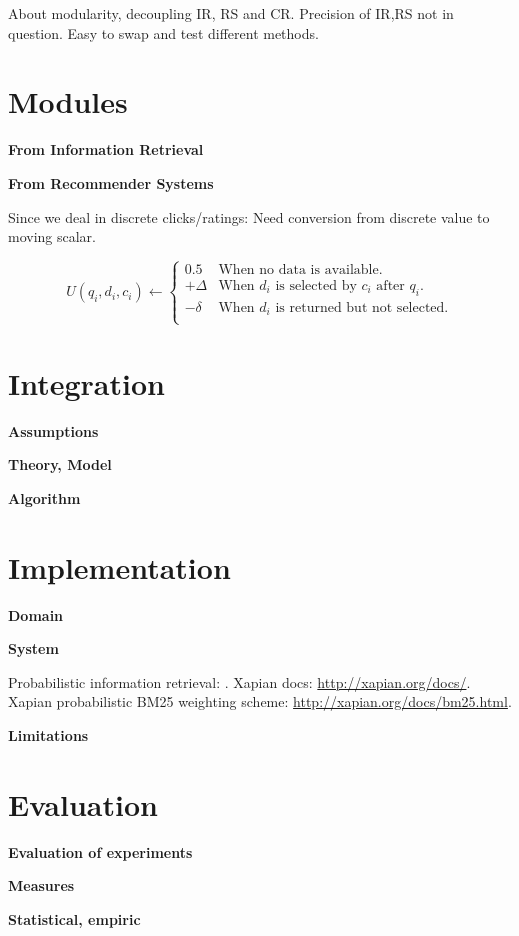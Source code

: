 About modularity, decoupling IR, RS and CR.
Precision of IR,RS not in question.
Easy to swap and test different methods.


\section{Modules}

\textbf{From Information Retrieval}

\textbf{From Recommender Systems}

Since we deal in discrete clicks/ratings: 
Need conversion from discrete value to moving scalar.

\begin{equation}
  U(q_i, d_i, c_i) \leftarrow 
  \begin{cases}
    0.5       &  \text{When no data is available.}\\
    +\Delta   &  \text{When $d_i$ is selected by $c_i$ after $q_i$.}\\
    -\delta   &  \text{When $d_i$ is returned but not selected.}\\
  \end{cases}
\end{equation}


\section{Integration}

\textbf{Assumptions}

\textbf{Theory, Model}

\textbf{Algorithm}


\section{Implementation}

\textbf{Domain}

\textbf{System}

Probabilistic information retrieval: \cite[p204]{Manning2008}.
Xapian docs: \url{http://xapian.org/docs/}.
Xapian probabilistic BM25 weighting scheme: \url{http://xapian.org/docs/bm25.html}.

\textbf{Limitations}


\section{Evaluation}


\textbf{Evaluation of experiments}

\textbf{Measures}

\textbf{Statistical, empiric}

